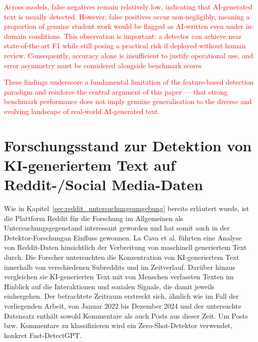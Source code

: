 \textcolor{red}{Across models, false negatives remain relatively low, indicating that AI-generated text is usually detected. However,
    false positives occur non-negligibly, meaning a proportion of genuine student work would be flagged as AI-written
    even under in-domain conditions. This observation is important: a detector can achieve near state-of-the-art F1 while
    still posing a practical risk if deployed without human review. Consequently, accuracy alone is insufficient to justify
    operational use, and error asymmetry must be considered alongside benchmark scores \autocite{pudasaini2026aigeneratedtextdetectionfails}}

\textcolor{red}{These findings
    underscore a fundamental limitation of the feature-based detection paradigm and reinforce the central argument of
    this paper — that strong benchmark performance does not imply genuine generalisation to the diverse and evolving
    landscape of real-world AI-generated text. \autocite{pudasaini2026aigeneratedtextdetectionfails}}

\section{Forschungsstand zur Detektion von KI-generiertem Text auf Reddit-/Social Media-Daten}
Wie in Kapitel~\ref{sec:reddit_untersuchungsumgebung} bereits erläutert wurde, ist die Plattform Reddit für die Forschung im Allgemeinen als Untersuchungsgegenstand interessant geworden und hat somit auch in der Detektor-Forschungan Einfluss gewonnen. La Cava et al. \autocite{LACAVA2026100355} führten eine Analyse von Reddit-Daten hinsichtlich der Verbreitung von maschinell generiertem Text durch. Die Forscher untersuchten die Konzentration von KI-generiertem Text innerhalb von verschiedenen Subreddits und im Zeitverlauf. Darüber hinaus vergleichen sie KI-generierten Text mit von Menschen verfassten Texten im Hinblick auf die Interaktionen und sozialen Signale, die damit jeweils einhergehen. Der betrachtete Zeitraum erstreckt sich, ähnlich wie im Fall der vorliegenden Arbeit, von Januar 2022 bis Dezember 2024 und der untersuchte Datensatz enthält sowohl Kommentare als auch Posts aus dieser Zeit. Um Posts bzw. Kommentare zu klassifizieren wird ein Zero-Shot-Detektor verwendet, konkret Fast-DetectGPT.
